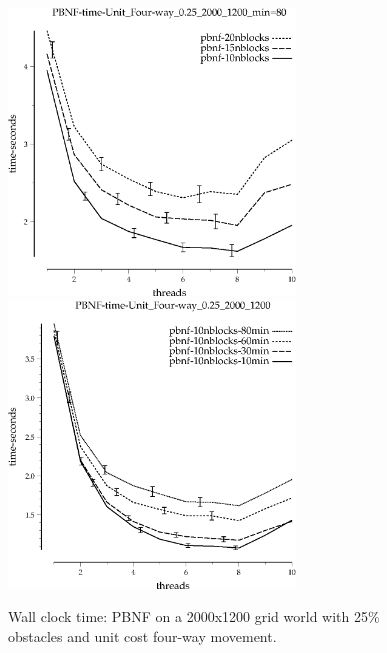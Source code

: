 \documentclass{article}
\begin{document}
\begin{figure}[t]
\begin{center}
\includegraphics[width=3in]{grid_unit_four-way_0.25_2000_1200/PBNF-time-Unit_Four-way_0.25_2000_1200_min=80.eps}
\includegraphics[width=3in]{grid_unit_four-way_0.25_2000_1200/PBNF-time-Unit_Four-way_0.25_2000_1200.eps}
\caption{Wall clock time: PBNF on a 2000x1200 grid world with 25\%
  obstacles and unit cost four-way movement.}
\end{center}
\end{figure}
\end{document}
